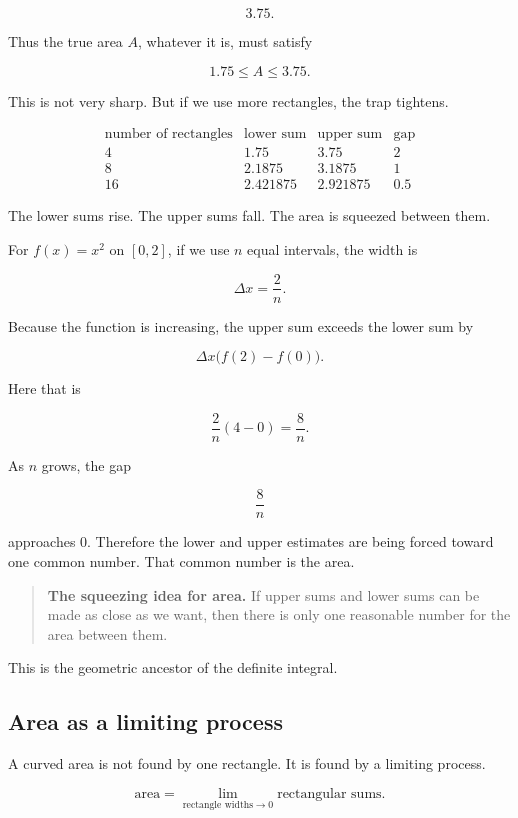 \[
3.75.
\]

Thus the true area \(A\), whatever it is, must satisfy

\[
1.75\le A\le 3.75.
\]

This is not very sharp.  But if we use more rectangles, the trap tightens.

\[
\begin{array}{c|c|c|c}
\text{number of rectangles} & \text{lower sum} & \text{upper sum} & \text{gap} \\ \hline
4 & 1.75 & 3.75 & 2 \\
8 & 2.1875 & 3.1875 & 1 \\
16 & 2.421875 & 2.921875 & 0.5
\end{array}
\]

The lower sums rise.  The upper sums fall.  The area is squeezed between them.

For \(f(x)=x^2\) on \([0,2]\), if we use \(n\) equal intervals, the width is

\[
\Delta x=\frac{2}{n}.
\]

Because the function is increasing, the upper sum exceeds the lower sum by

\[
\Delta x\bigl(f(2)-f(0)\bigr).
\]

Here that is

\[
\frac{2}{n}(4-0)=\frac{8}{n}.
\]

As \(n\) grows, the gap

\[
\frac{8}{n}
\]

approaches \(0\).  Therefore the lower and upper estimates are being forced toward
one common number.  That common number is the area.

\begin{quote}
\textbf{The squeezing idea for area.}
If upper sums and lower sums can be made as close as we want, then there is only one
reasonable number for the area between them.
\end{quote}

This is the geometric ancestor of the definite integral.

\subsection{Area as a limiting process}
\label{subsec:area-as-limiting-process}

A curved area is not found by one rectangle.  It is found by a limiting process.

\[
\text{area}
=
\lim_{\text{rectangle widths}\to0}
\text{rectangular sums}.
\]

